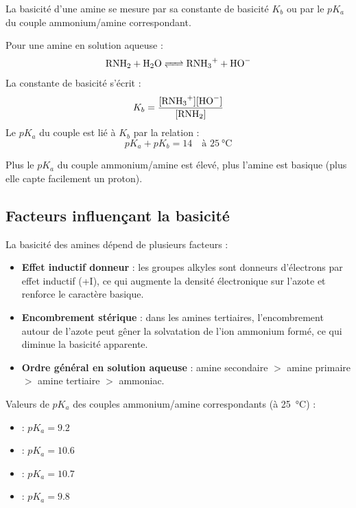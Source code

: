 La basicité d'une amine se mesure par sa constante de basicité $K_b$ ou par le $pK_a$ du couple ammonium/amine correspondant.

\begin{propriete}
Pour une amine  en solution aqueuse :
\[\ce{RNH2 + H2O <=> RNH3+ + HO-}\]
La constante de basicité s'écrit :
\[K_b = \frac{[\ce{RNH3+}][\ce{HO-}]}{[\ce{RNH2}]}\]
Le $pK_a$ du couple  est lié à $K_b$ par la relation :
\[pK_a + pK_b = 14 \quad \text{à } \SI{25}{\celsius}\]
\end{propriete}

\begin{aretenir}
Plus le $pK_a$ du couple ammonium/amine est élevé, plus l'amine est basique (plus elle capte facilement un proton).
\end{aretenir}

\subsection{Facteurs influençant la basicité}

La basicité des amines dépend de plusieurs facteurs :

\begin{propriete}
\begin{itemize}
    \item \textbf{Effet inductif donneur} : les groupes alkyles sont donneurs d'électrons par effet inductif (+I), ce qui augmente la densité électronique sur l'azote et renforce le caractère basique.
    \item \textbf{Encombrement stérique} : dans les amines tertiaires, l'encombrement autour de l'azote peut gêner la solvatation de l'ion ammonium formé, ce qui diminue la basicité apparente.
    \item \textbf{Ordre général en solution aqueuse} : amine secondaire $>$ amine primaire $>$ amine tertiaire $>$ ammoniac.
\end{itemize}
\end{propriete}

\begin{exemple}
Valeurs de $pK_a$ des couples ammonium/amine correspondants (à \SI{25}{\celsius}) :
\begin{itemize}
    \item {} : $pK_a = \num{9.2}$
    \item {} : $pK_a = \num{10.6}$
    \item {} : $pK_a = \num{10.7}$
    \item {} : $pK_a = \num{9.8}$
\end{itemize}
\end{exemple}

